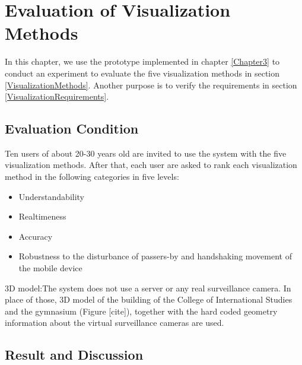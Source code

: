 \chapter{Evaluation of Visualization Methods}
\label{Chapter4}

In this chapter, we use the prototype implemented in chapter \ref{Chapter3} to conduct an experiment to evaluate the five visualization methods in section \ref{VisualizationMethods}. Another purpose is to verify the requirements in section \ref{VisualizationRequirements}.


\section{Evaluation Condition}

Ten users of about 20-30 years old are invited to use the system with the five visualization methods. After that, each user are asked to rank each visualization method in the following categories in five levels:

\begin{itemize}
	\item Understandability
	\item Realtimeness
	\item Accuracy
	\item Robustness to the disturbance of passers-by and handshaking movement of the mobile device
\end{itemize}

3D model:The system does not use a server or any real surveillance camera. In place of those, 3D model of the building of the College of International Studies and the gymnasium (Figure [cite]), together with the hard coded geometry information about the virtual surveillance cameras are used.


\section{Result and Discussion}

